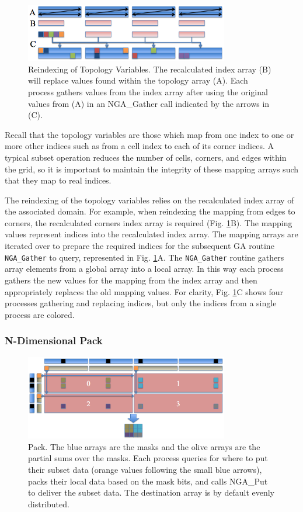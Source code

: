\begin{figure}[!t]
\center
\includegraphics[width=3.5in]{images/reindex}
\caption{Reindexing of Topology Variables.  The recalculated index array (B)
will replace values found within the topology array (A).  Each process gathers
values from the index array after using the original values from (A) in an
NGA\_Gather call indicated by the arrows in (C).}
\label{fig:reindex}
\end{figure}

Recall that the topology variables are those which map from one index to
one or more other indices such as from a cell index to each of its corner
indices.  A typical subset operation reduces the number of cells, corners, and
edges within the grid, so it is important to maintain the integrity of these
mapping arrays such that they map to real indices.

The reindexing of the topology variables relies on the recalculated index
array of the associated domain.  For example, when reindexing the mapping from
edges to corners, the recalculated corners index array is required (Fig.
\ref{fig:reindex}B).  The mapping values represent indices into the
recalculated index array.  The mapping arrays are iterated over to prepare the
required indices for the subsequent GA routine \verb=NGA_Gather= to query,
represented in Fig.  \ref{fig:reindex}A.  The \verb=NGA_Gather= routine
gathers array elements from a global array into a local array.  In this way
each process gathers the new values for the mapping from the index array and
then appropriately replaces the old mapping values.  For clarity, Fig.
\ref{fig:reindex}C shows four processes gathering and replacing indices, but
only the indices from a single process are colored.

\subsubsection{N-Dimensional Pack}
\label{section:alg_pack}

\begin{figure}[!t]
\center
\includegraphics[width=3.5in]{images/pack}
\caption{Pack.  The blue arrays are the masks and the olive arrays are the
partial sums over the masks.  Each process queries for where to put their
subset data (orange values following the small blue arrows), packs their local
data based on the mask bits, and calls NGA\_Put to deliver the subset data.
The destination array is by default evenly distributed.}
\label{fig:pack}
\end{figure}

